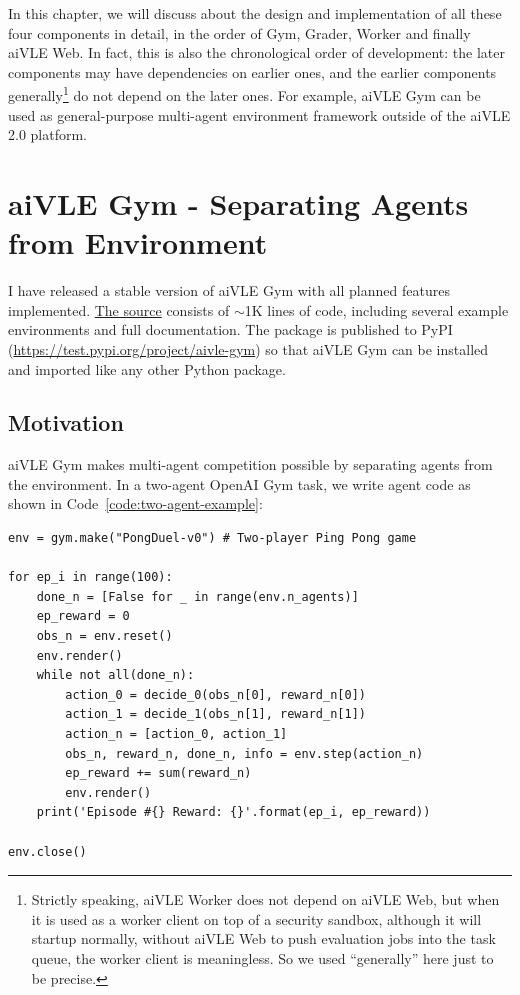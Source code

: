In this chapter, we will discuss about the design and implementation of all these four components in detail, in the order of Gym, Grader, Worker and finally aiVLE Web. In fact, this is also the chronological order of development: the later components may have dependencies on earlier ones, and the earlier components generally\footnote{Strictly speaking, aiVLE Worker does not depend on aiVLE Web, but when it is used as a worker client on top of a security sandbox, although it will startup normally, without aiVLE Web to push evaluation jobs into the task queue, the worker client is meaningless. So we used ``generally'' here just to be precise.} do not depend on the later ones. For example, aiVLE Gym can be used as general-purpose multi-agent environment framework outside of the aiVLE 2.0 platform.

\section{aiVLE Gym - Separating Agents from Environment}
\label{ch:aivle-gym}
I have released a stable version of aiVLE Gym with all planned features implemented. \href{https://github.com/edu-ai/aivle-gym}{The source} consists of $\sim$1K lines of code, including several example environments and full documentation. The package is published to PyPI  (\href{https://test.pypi.org/project/aivle-gym}{https://test.pypi.org/project/aivle-gym}) so that aiVLE Gym can be installed and imported like any other Python package.

\subsection{Motivation}
aiVLE Gym makes multi-agent competition possible by separating agents from the environment. In a two-agent OpenAI Gym task, we write agent code as shown in Code~\ref{code:two-agent-example}:

\begin{code}
\begin{verbatim}
env = gym.make("PongDuel-v0") # Two-player Ping Pong game

for ep_i in range(100):
    done_n = [False for _ in range(env.n_agents)]
    ep_reward = 0
    obs_n = env.reset()
    env.render()
    while not all(done_n):
        action_0 = decide_0(obs_n[0], reward_n[0])
        action_1 = decide_1(obs_n[1], reward_n[1])
        action_n = [action_0, action_1]
        obs_n, reward_n, done_n, info = env.step(action_n)
        ep_reward += sum(reward_n)
        env.render()
    print('Episode #{} Reward: {}'.format(ep_i, ep_reward))

env.close()
\end{verbatim}
\label{code:two-agent-example}
\end{code}

